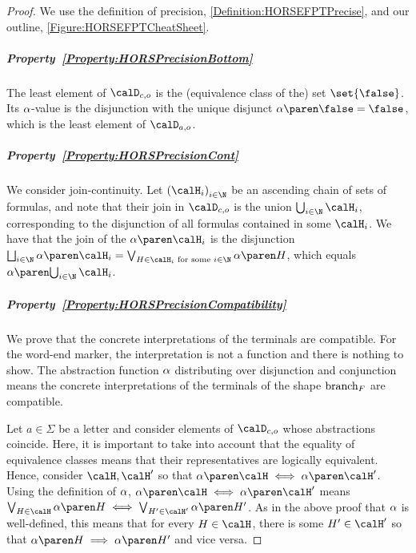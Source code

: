 \documentclass[../../diss.tex]{subfiles}
\begin{document}
\begin{proof}
    We use the definition of precision, \cref{Definition:HORSEFPTPrecise}, and our outline, \cref{Figure:HORSEFPTCheatSheet}.

    \subparagraph{Property~\ref{Property:HORSPrecisionBottom}}
    The least element of $\domainc{\ground}$ is the (equivalence class of the) set $\set{\false}$.
    Its $\abs$-value is the disjunction with the unique disjunct $\abs{\false} = \false$, which is the least element of $\domaina{\ground}$.

    \subparagraph{Property~\ref{Property:HORSPrecisionCont}}
    We consider join-continuity.
    Let ${(\sof_i)}_{i \in \N}$ be an ascending chain of sets of formulas, and note that their join in $\domainc{\ground}$ is the union $\bigcup_{i \in \N} \sof_i$, corresponding to the disjunction of all formulas contained in some $\sof_i$.
    We have that the join of the $\abs{\sof_i}$ is the disjunction $\bigsqcup_{i \in \N} \abs{\sof_i} = \bigvee_{H \in \sof_i \text{ for some } i \in \N} \abs{H}$, which equals $\abs{ \bigcup_{i \in \N} \sof_i  }$.

    \subparagraph{Property~\ref{Property:HORSPrecisionCompatibility}}
    We prove that the concrete interpretations of the terminals are compatible.
    For the word-end marker, the interpretation is not a function and there is nothing to show.
    The abstraction function $\abs$ distributing over disjunction and conjunction means the concrete interpretations of the terminals of the shape $\text{branch}_F$ are compatible.

    Let $a \in \Sigma$ be a letter and consider elements of $\domainc{\ground}$ whose abstractions coincide.
    Here, it is important to take into account that the equality of equivalence classes means that their representatives are logically equivalent.
    Hence, consider $\sof, \sof'$ so that $\abs{\sof} \lequiv \abs{\sof'}$.
    Using the definition of $\abs$, $\abs{\sof} \lequiv \abs{\sof'}$ means $\bigvee_{H \in \sof} \abs{H} \lequiv \bigvee_{H' \in \sof'} \abs{H'}$.
    As in the above proof that $\abs$ is well-defined, this means that for every $H \in \sof$, there is some $H' \in \sof'$ so that $\abs{H} \lleq \abs{H'}$ and vice versa.


\end{proof}
\end{document}
